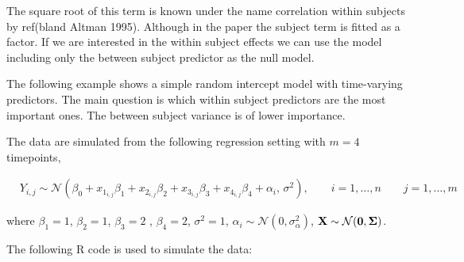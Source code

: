\documentclass[11pt,a4paper,twoside]{book}\usepackage[]{graphicx}\usepackage[]{color}
\begin{document}
The square root of this term is known under the name correlation within subjects by ref(bland Altman 1995). Although in the paper the subject term is fitted as a factor. If we are interested in the within subject effects we can use the model including only the between subject predictor as the null model.

The following example shows a simple random intercept model with time-varying predictors. The main question is which within subject predictors are the most important ones. The between subject variance is of lower importance. 

The data are simulated from the following regression setting with $m = 4$ timepoints,

\begin{align} 
&Y_{i,j} \sim \mathcal{N}(\beta_{0}+x_{1_{i,j}} \beta_{1}+x_{2_{i,j}} \beta_{2}+x_{3_{i,j}} \beta_{3}+x_{4_{i,j}} \beta_{4} + \alpha_{i}, \, \sigma^2), \qquad i = 1, \dots, n \qquad j = 1, \dots, m
\end{align} 

where $\beta_{1} = 1$, $\beta_{2} = 1$,  $\beta_{3} = 2$ , $\beta_{4}=2$, $\sigma^2 = 1$, $\alpha_{i} \sim \mathcal{N}(0, \sigma_{\alpha}^2)$, ${\mathbf{X}} \sim \mathcal{N}({\mathbf{0}}, {\boldsymbol{\Sigma}}{})$.

The following R code is used to simulate the data:
\end{document}
